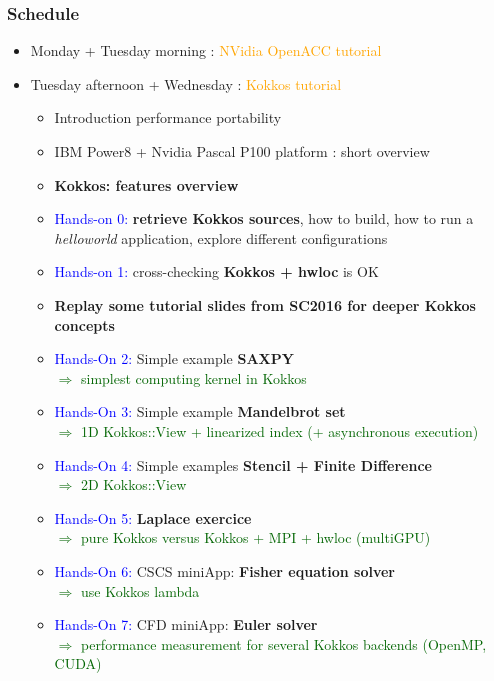 \begin{frame}
  \frametitle{Schedule}

  \begin{itemize}
  \item Monday + Tuesday morning : \textcolor{orange}{NVidia OpenACC tutorial}
  \item Tuesday afternoon + Wednesday : \textcolor{orange}{Kokkos tutorial}
    \begin{itemize}
    \item Introduction performance portability
    \item IBM Power8 + Nvidia Pascal P100 platform : short overview
    \item \textbf{Kokkos: features overview}
    \item \textcolor{blue}{Hands-on 0:} \textbf{retrieve Kokkos sources}, how to build, how to run a \textit{helloworld} application, explore different configurations
    \item \textcolor{blue}{Hands-on 1:} cross-checking \textbf{Kokkos + hwloc} is OK
    \item \textbf{Replay some tutorial slides from SC2016 for deeper Kokkos concepts}
    \item \textcolor{blue}{Hands-On 2:} Simple example \textbf{SAXPY}\\
      \textcolor{darkgreen}{$\Rightarrow$ simplest computing kernel in Kokkos}
    \item \textcolor{blue}{Hands-On 3:} Simple example \textbf{Mandelbrot set}\\
      \textcolor{darkgreen}{$\Rightarrow$ 1D Kokkos::View + linearized index (+ asynchronous execution)}
    \item \textcolor{blue}{Hands-On 4:} Simple examples \textbf{Stencil + Finite Difference}\\
      \textcolor{darkgreen}{$\Rightarrow$ 2D Kokkos::View}
    \item \textcolor{blue}{Hands-On 5:} \textbf{Laplace exercice}\\
      \textcolor{darkgreen}{$\Rightarrow$ pure Kokkos versus Kokkos + MPI + hwloc (multiGPU)}
    \item \textcolor{blue}{Hands-On 6:} CSCS miniApp: \textbf{Fisher equation solver}\\
      \textcolor{darkgreen}{$\Rightarrow$ use Kokkos lambda}
    \item \textcolor{blue}{Hands-On 7:} CFD miniApp: \textbf{Euler solver}\\
      \textcolor{darkgreen}{$\Rightarrow$ performance measurement for several Kokkos backends (OpenMP, CUDA)}
    \end{itemize}
  \end{itemize}

\end{frame}
